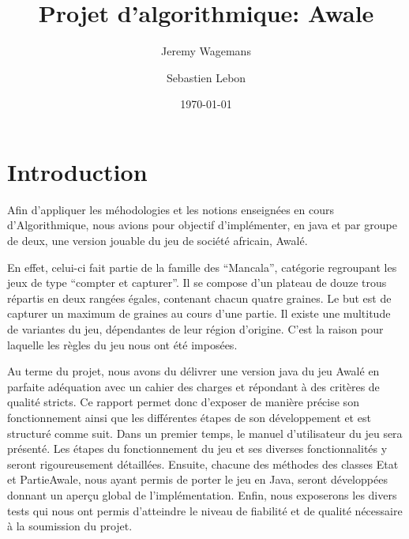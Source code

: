 \documentclass[11pt,a4paper]{report}
\title{Projet d'algorithmique: Awale}
\author{Jeremy Wagemans \and Sebastien Lebon}
\date{\today}
\begin{document}

    \maketitle

    \tableofcontents

    \begingroup
        \setlength{\parskip}{\baselineskip}
        \chapter{Introduction}

Afin d’appliquer les méhodologies et les notions enseignées en cours d'Algorithmique, nous avions pour objectif d'implémenter, en java et par groupe de deux, une version jouable du jeu de société africain, Awalé.
\par
En effet, celui-ci fait partie de la famille des “Mancala”, catégorie regroupant les jeux de type “compter et capturer”. Il se compose d’un plateau de douze trous répartis en deux rangées égales, contenant chacun quatre graines. Le but est de capturer un maximum de graines au cours d'une partie.\newline
Il existe une multitude de variantes du jeu, dépendantes de leur région d'origine. C'est la raison pour laquelle les règles du jeu nous ont été imposées.
\par
Au terme du projet, nous avons du délivrer une version java du jeu Awalé en parfaite adéquation avec un cahier des charges et répondant à des critères de qualité stricts.
Ce rapport permet donc d'exposer de manière précise son fonctionnement ainsi que les différentes étapes de son développement et est structuré comme suit.\newline
Dans un premier temps, le manuel d'utilisateur du jeu sera présenté. Les étapes du fonctionnement du jeu et ses diverses fonctionnalités y seront rigoureusement détaillées.\newline
Ensuite, chacune des méthodes des classes Etat et PartieAwale, nous ayant permis de porter le jeu en Java, seront développées donnant un aperçu global de l'implémentation.\newline
Enfin, nous exposerons les divers tests qui nous ont permis d'atteindre le niveau de fiabilité et de qualité nécessaire à la soumission du projet.
\end{document}
